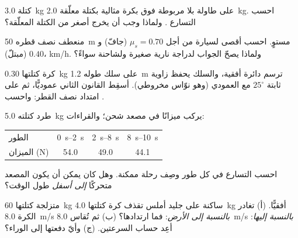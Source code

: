 \begin{exercise}[$\star\star$]\label{exo:g12:newtons-laws:8}
كتلة \qty{3.0}{kg} على طاولة بلا  مربوطة فوق بكرة مثالية بكتلة
معلّقة \qty{2.0}{kg}. احسب التسارع . ولماذا وجب أن يخرج
 أصغر من  الكتلة المعلّقة؟
\end{exercise}

\begin{exercise}[$\star\star$]\label{exo:g12:newtons-laws:9}
منعطف نصف قطره \qty{50}{m} مستوٍ. احسب أقصى  لسيارة من أجل
$\mu_s = 0.70$ (جافّ) و$0.40$ (مبتلّ)،  \unit{km/h}. ولماذا يصحّ الجواب
لدراجة نارية صغيرة ولشاحنة سواءً؟
\end{exercise}

\begin{exercise}[$\star\star$]\label{exo:g12:newtons-laws:10}
كرة كتلتها \qty{0.30}{kg} على سلك طوله \qty{1.2}{m} ترسم دائرة أفقية، والسلك
يحفظ زاوية ثابتة $25^\circ$ مع العمودي (وهو نوّاس مخروطي). أسقِط
القانون الثاني عموديًّا، ثم على امتداد نصف القطر: واحسب  .
\end{exercise}

\begin{exercise}[$\star\star$]\label{exo:g12:newtons-laws:11}
طرد كتلته \qty{5.0}{kg} يركب ميزانًا في مصعد شحن؛ والقراءات:
\begin{center}\small\begin{tabular}{lccc}
الطور & \qtyrange{0}{2}{s} & \qtyrange{2}{8}{s} & \qtyrange{8}{10}{s}\\
الميزان (\unit{N}) & 54.0 & 49.0 & 44.1
\end{tabular}\end{center}
احسب التسارع في كل طور وصِف رحلة ممكنة. وهل كان يمكن أن يكون المصعد
متحركًا \emph{إلى أسفل} طول الوقت؟
\end{exercise}

\begin{exercise}[$\star\star\star$]\label{exo:g12:newtons-laws:12}
متزلجة كتلتها \qty{60}{kg} ساكنة على جليد أملس تقذف كرة كتلتها \qty{4.0}{kg}
أفقيًّا. (أ) تغادر الكرة  \qty{8.0}{m/s} \emph{بالنسبة إلى الأرض}: فما
 ارتدادها؟ (ب) ثم تُقاس \qty{8.0}{m/s} \emph{بالنسبة إليها}:
أعِد حساب السرعتين. (ج) وأيّ  دفعتها إلى الوراء؟
\end{exercise}

